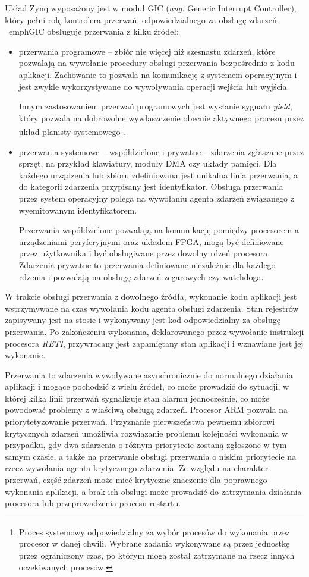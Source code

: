 Układ Zynq wyposażony jest w moduł GIC (\emph{ang.} Generic Interrupt Controller), który pełni rolę kontrolera przerwań, odpowiedzialnego za obsługę zdarzeń. \
emph{GIC} obsługuje przerwania z kilku źródeł:
\begin{itemize}
	\item przerwania programowe -- zbiór nie więcej niż szesnastu zdarzeń, które pozwalają na wywołanie procedury obsługi przerwania bezpośrednio z kodu aplikacji. Zachowanie to pozwala na komunikację z systemem operacyjnym i jest zwykle wykorzystywane do wywoływania operacji wejścia lub wyjścia. 
	
	Innym zastosowaniem przerwań programowych jest wysłanie sygnału \emph{yield}, który pozwala na dobrowolne wywłaszczenie obecnie aktywnego procesu przez układ planisty systemowego\footnote{Proces systemowy odpowiedzialny za wybór procesów do wykonania przez procesor w danej chwili. Wybrane zadania wykonywane są przez jednostkę przez ograniczony czas, po którym mogą został zatrzymane na rzecz innych oczekiwanych procesów.}. 
	
	\item przerwania systemowe -- współdzielone i prywatne -- zdarzenia zgłaszane przez sprzęt, na przykład klawiatury, moduły DMA czy układy pamięci. 
	Dla każdego urządzenia lub zbioru zdefiniowana jest unikalna linia przerwania, a do kategorii zdarzenia przypisany jest identyfikator. 
	Obsługa przerwania przez system operacyjny polega na wywołaniu agenta zdarzeń związanego z wyemitowanym identyfikatorem.
	
	Przerwania współdzielone pozwalają na komunikację pomiędzy procesorem a urządzeniami peryferyjnymi oraz układem FPGA, mogą być definiowane przez użytkownika i być obsługiwane przez dowolny rdzeń procesora. 
	Zdarzenia prywatne to przerwania definiowane niezależnie dla każdego rdzenia i pozwalają na obsługę zdarzeń zegarowych czy watchdoga.
\end{itemize}

W trakcie obsługi przerwania z dowolnego źródła, wykonanie kodu aplikacji jest wstrzymywane na czas wywołania kodu agenta obsługi zdarzenia. 
Stan rejestrów zapisywany jest na stosie i wykonywany jest kod odpowiedzialny za obsługę przerwania. 
Po zakończeniu wykonania, deklarowanego przez wywołanie instrukcji procesora \emph{RETI}, przywracany jest zapamiętany stan aplikacji i wznawiane jest jej wykonanie.

Przerwania to zdarzenia wywoływane asynchronicznie do normalnego działania aplikacji i mogące pochodzić z wielu źródeł, co może prowadzić do sytuacji, w której kilka linii przerwań sygnalizuje stan alarmu jednocześnie, co może powodować problemy z właściwą obsługą zdarzeń.
Procesor ARM pozwala na priorytetyzowanie przerwań. 
Przyznanie pierwszeństwa pewnemu zbiorowi krytycznych zdarzeń umożliwia rozwiązanie problemu kolejności wykonania w przypadku, gdy dwa zdarzenia o różnym priorytecie zostaną zgłoszone w tym samym czasie, a także na przerwanie obsługi przerwania o niskim priorytecie na rzecz wywołania agenta krytycznego zdarzenia.
Ze względu na charakter przerwań, część zdarzeń może mieć krytyczne znaczenie dla poprawnego wykonania aplikacji, a brak ich obsługi może prowadzić do zatrzymania działania procesora lub przeprowadzenia procesu restartu.

